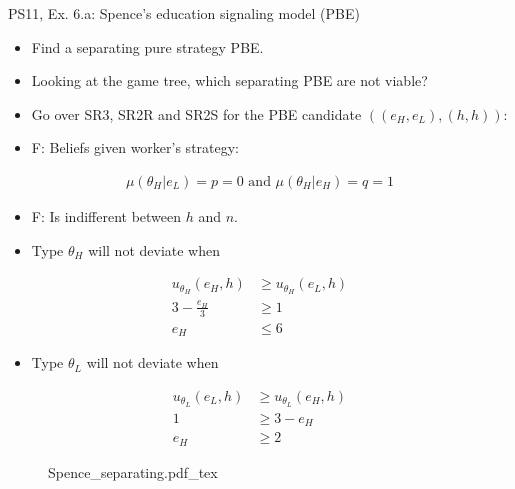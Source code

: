 \begin{frame}{PS11, Ex. 6.a: Spence’s education signaling model (PBE)}
    \begin{multicols}{2}
      \begin{itemize}
        \item[(a)] Find a separating pure strategy PBE.
        \item[Step 1:] Looking at the game tree, which separating PBE are not viable?
        \item[Step 2:] Go over SR3, SR2R and SR2S for the PBE candidate $((e_H,e_L),(h,h))$:
        \item[SR3:] F: Beliefs given worker's strategy:
      \end{itemize}\vspace{-10pt}
      \begin{align*}
        \mu(\theta_H|e_L)=p=0\text{ and }\mu(\theta_H|e_H)=q=1
      \end{align*}\vspace{-20pt}
      \begin{itemize}
        \item[SR2R:] F: Is indifferent between $h$ and $n$.
        \item[SR2S:] Type $\theta_H$ will not deviate when
      \end{itemize}\vspace{-12pt}
      \begin{align*}
        u_{\theta_H}(e_H,h)&\geq u_{\theta_H}(e_L,h)\\
        3-\frac{e_H}{3}&\geq1\\
        e_H&\leq6
      \end{align*}\vspace{-20pt}
      \begin{itemize}
        \item[] Type $\theta_L$ will not deviate when
      \end{itemize}\vspace{-12pt}
      \begin{align*}
        u_{\theta_L}(e_L,h)&\geq u_{\theta_L}(e_H,h)\\
        1&\geq3-e_H\\
        e_H&\geq2
      \end{align*}
      \vfill\null\columnbreak
      \begin{figure}[!h]
        \center{}
        {Spence_separating.pdf_tex}
      \end{figure}\vspace{-6pt}

\end{multicols}
\end{frame}
